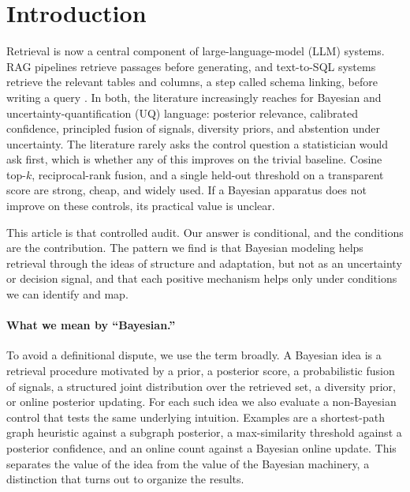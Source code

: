 \documentclass[11pt]{article}
\begin{document}
\section{Introduction}

Retrieval is now a central component of large-language-model (LLM) systems. RAG pipelines
\citep{lewis2020rag} retrieve passages before generating, and text-to-SQL systems retrieve the relevant
tables and columns, a step called schema linking, before writing a query \citep{wang2020ratsql}. In
both, the literature increasingly reaches for Bayesian and uncertainty-quantification (UQ) language:
posterior relevance, calibrated confidence, principled fusion of signals, diversity priors, and
abstention under uncertainty. The literature rarely asks the control question a statistician would ask
first, which is whether any of this improves on the trivial baseline. Cosine top-$k$, reciprocal-rank
fusion, and a single held-out threshold on a transparent score are strong, cheap, and widely used. If a
Bayesian apparatus does not improve on these controls, its practical value is unclear.

This article is that controlled audit. Our answer is conditional, and the conditions are the
contribution. The pattern we find is that Bayesian modeling helps retrieval through the ideas of
structure and adaptation, but not as an uncertainty or decision signal, and that each positive
mechanism helps only under conditions we can identify and map.

\paragraph{What we mean by ``Bayesian.''} To avoid a definitional dispute, we use the term broadly. A
Bayesian idea is a retrieval procedure motivated by a prior, a posterior score, a probabilistic fusion
of signals, a structured joint distribution over the retrieved set, a diversity prior, or online
posterior updating. For each such idea we also evaluate a non-Bayesian control that tests the same
underlying intuition. Examples are a shortest-path graph heuristic against a subgraph posterior, a
max-similarity threshold against a posterior confidence, and an online count against a Bayesian online
update. This separates the value of the idea from the value of the Bayesian machinery, a distinction
that turns out to organize the results.
\end{document}
